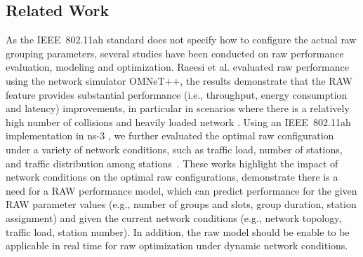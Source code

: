  
\subsection{Related Work \label{subsec:related_work}}


As the IEEE~802.11ah standard does not specify how to configure the actual \gls{raw} grouping parameters, several studies have been conducted on \gls{raw} performance evaluation, modeling and optimization. Raeesi et al. evaluated  \gls{raw} performance using the network simulator OMNeT++, the results demonstrate that the RAW feature provides
substantial performance (i.e., throughput, energy consumption and latency) improvements, in particular in scenarios where there is a relatively high number of collisions and heavily loaded network \cite{Raeesi2014a}. Using an IEEE~802.11ah implementation in ns-3
\cite{WNS32016}, we further evaluated the optimal \gls{raw}  configuration under a variety of network conditions, such as traffic load, number of stations, and traffic distribution among stations~\cite{WoWMoM2016}. These works highlight the impact of network conditions on the optimal \gls{raw} configurations, demonstrate there is a need for a \gls{RAW} performance model, which can predict performance for the given RAW parameter values (e.g., number of groups and slots, group duration, station assignment) and given the current network conditions (e.g., network topology, traffic load, station number). In addition, the \gls{raw} model should be enable to be applicable in real time for \gls{raw} optimization under dynamic network conditions.




